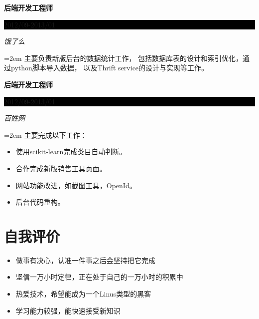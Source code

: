 \documentclass[paper=a4,fontsize=10pt]{scrartcl}	 			%
\newcommand{\sepspace}{\vspace*{1em}}			%
\newcommand{\NewPart}[1]{\section*{\uppercase{#1}}}
\newcommand{\EducationEntry}[4]{
		\noindent \textbf{#1} \hfill 					%
		\colorbox{Black}{%
			\parbox{8em}{%
			\hfill\color{White}#2}} \par				%
		\noindent \textit{#3} \par					%
		\noindent\hangindent=2em\hangafter=0  #4 	%
		\normalsize \par}
\begin{document}
\EducationEntry{后端开发工程师}{2012/09-2013/01}{饿了么}
{主要负责新版后台的数据统计工作，
包括数据库表的设计和索引优化，通过python脚本导入数据，
以及Thrift service的设计与实现等工作。
}
\sepspace

\EducationEntry{后端开发工程师}{2012/09-2013/01}{百姓网}
{主要完成以下工作：
\begin{itemize} \itemsep -0pt  %
    \item 使用scikit-learn完成类目自动判断。
    \item 合作完成新版销售工具页面。
    \item 网站功能改进，如截图工具，OpenId。
    \item 后台代码重构。
\end{itemize}
}

\NewPart{自我评价}{}
\begin{itemize}\itemsep -0pt
\item 做事有决心，认准一件事之后会坚持把它完成
\item 坚信一万小时定律，正在处于自己的一万小时的积累中
\item 热爱技术，希望能成为一个Linus类型的黑客
\item 学习能力较强，能快速接受新知识
\end{itemize}
\end{document}
